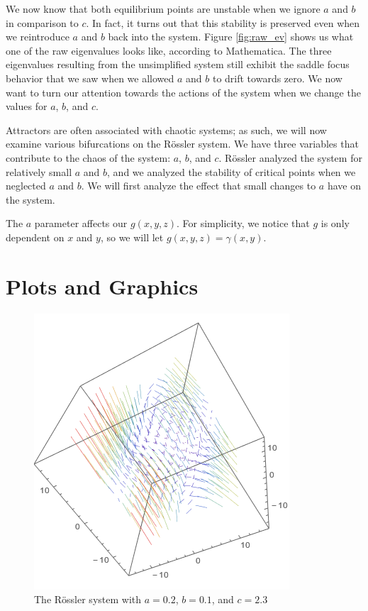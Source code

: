 \documentclass{article}
\begin{document}
We now know that both equilibrium points are unstable when we ignore $a$ and $b$ in comparison to $c$. In fact, it turns out that this stability is preserved even when we reintroduce $a$ and $b$ back into the system. Figure \ref{fig:raw_ev} shows us what one of the raw eigenvalues looks like, according to Mathematica. The three eigenvalues resulting from the unsimplified system still exhibit the saddle focus behavior that we saw when we allowed $a$ and $b$ to drift towards zero. We now want to turn our attention towards the actions of the system when we change the values for $a$, $b$, and $c$.

Attractors are often associated with chaotic systems; as such, we will now examine various bifurcations on the R\"{o}ssler system. We have three variables that contribute to the chaos of the system: $a$, $b$, and $c$. R\"{o}ssler analyzed the system for relatively small $a$ and $b$, and we analyzed the stability of critical points when we neglected $a$ and $b$. We will first analyze the effect that small changes to $a$ have on the system.

The $a$ parameter affects our $g(x,y,z)$. For simplicity, we notice that $g$ is only dependent on $x$ and $y$, so we will let $g(x,y,z)=\gamma(x,y)$. 

\newpage
\clearpage
\section*{Plots and Graphics}
\begin{figure}[h]
	\centering
	\includegraphics[scale=0.5]{vp_01.png}
	\caption{The R\"{o}ssler system with $a=0.2$, $b=0.1$, and $c=2.3$}
	\label{fig:3dsys_01}
\end{figure}
\end{document}
